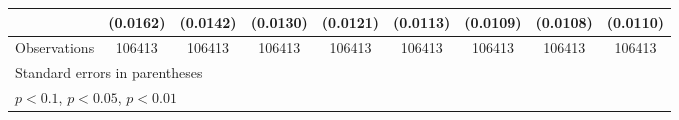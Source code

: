 {\begin{tabular}{l*{8}{c}}
                    &    (0.0162)         &    (0.0142)         &    (0.0130)         &    (0.0121)         &    (0.0113)         &    (0.0109)         &    (0.0108)         &    (0.0110)         \\
\hline
Observations        &      106413         &      106413         &      106413         &      106413         &      106413         &      106413         &      106413         &      106413         \\
\hline\hline
\multicolumn{9}{l}{\footnotesize Standard errors in parentheses}\\
\multicolumn{9}{l}{\footnotesize \sym{*} \(p<0.1\), \sym{**} \(p<0.05\), \sym{***} \(p<0.01\)}\\
\end{tabular}
}
